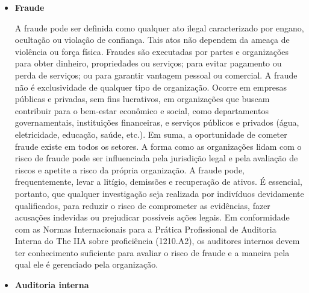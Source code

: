 \documentclass[a4paper]{article}
\begin{document}
\begin{itemize}
    \item \textbf{{Fraude}}
    \par A fraude pode ser definida como qualquer ato ilegal caracterizado por engano, ocultação ou violação de confiança. Tais atos não dependem da ameaça de violência ou força física. Fraudes são executadas por partes e organizações para obter dinheiro, propriedades ou serviços; para evitar pagamento ou perda de serviços; ou para garantir vantagem pessoal ou comercial. A fraude não é exclusividade de qualquer tipo de organização. Ocorre em empresas públicas e privadas, sem fins lucrativos, em organizações que buscam contribuir para o bem-estar econômico e social, como departamentos governamentais, instituições financeiras, e serviços públicos e privados (água, eletricidade, educação, saúde, etc.). Em suma, a oportunidade de cometer fraude existe em todos os setores. A forma como as organizações lidam com o risco de fraude pode ser influenciada pela jurisdição legal e pela avaliação de riscos e apetite a risco da própria organização. A fraude pode, frequentemente, levar a litígio, demissões e recuperação de ativos. É essencial, portanto, que qualquer investigação seja realizada por indivíduos devidamente qualificados, para reduzir o risco de comprometer as evidências, fazer acusações indevidas ou prejudicar possíveis ações legais. Em conformidade com as Normas Internacionais para a Prática Profissional de Auditoria Interna do The IIA sobre proficiência (1210.A2), os auditores internos devem ter conhecimento suficiente para avaliar o risco de fraude e a maneira pela qual ele é gerenciado pela organização.
    \item \textbf{{Auditoria interna}}

\end{itemize}
\end{document}
